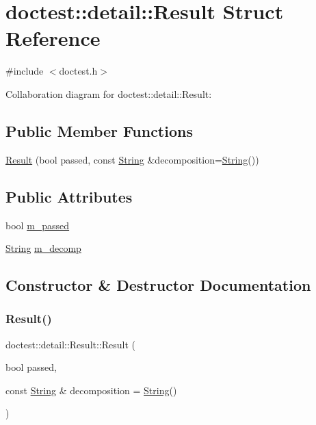 \hypertarget{structdoctest_1_1detail_1_1_result}{}\section{doctest\+:\+:detail\+:\+:Result Struct Reference}
\label{structdoctest_1_1detail_1_1_result}


{\ttfamily \#include $<$doctest.\+h$>$}



Collaboration diagram for doctest\+:\+:detail\+:\+:Result\+:
\subsection*{Public Member Functions}
\begin{DoxyCompactItemize}
\item 
\hyperlink{structdoctest_1_1detail_1_1_result_ae4d2e8633aedaffa31f5c8b8530f522c}{Result} (bool passed, const \hyperlink{classdoctest_1_1_string}{String} \&decomposition=\hyperlink{classdoctest_1_1_string}{String}())
\end{DoxyCompactItemize}
\subsection*{Public Attributes}
\begin{DoxyCompactItemize}
\item 
bool \hyperlink{structdoctest_1_1detail_1_1_result_a03ff571186856a429ada967ddfdf3006}{m\+\_\+passed}
\item 
\hyperlink{classdoctest_1_1_string}{String} \hyperlink{structdoctest_1_1detail_1_1_result_a97968e037266580a799ab3deb9365b79}{m\+\_\+decomp}
\end{DoxyCompactItemize}


\subsection{Constructor \& Destructor Documentation}
\mbox{\label{structdoctest_1_1detail_1_1_result_ae4d2e8633aedaffa31f5c8b8530f522c}} 
\subsubsection{\texorpdfstring{Result()}{Result()}}
{\footnotesize\ttfamily doctest\+::detail\+::\+Result\+::\+Result (\begin{DoxyParamCaption}\item[{bool}]{passed,  }\item[{const \hyperlink{classdoctest_1_1_string}{String} \&}]{decomposition = {\ttfamily \hyperlink{classdoctest_1_1_string}{String}()} }\end{DoxyParamCaption})}



